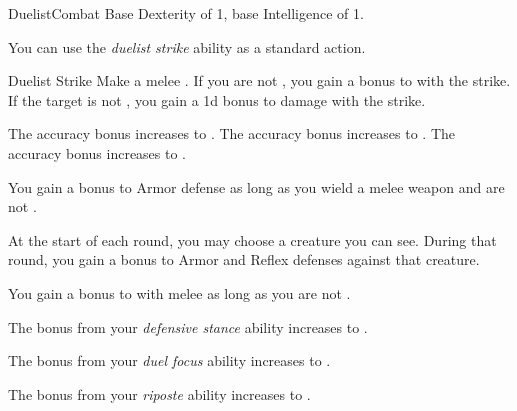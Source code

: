     \begin{feat}{Duelist}{Combat}
        \featpre Base Dexterity of 1, base Intelligence of 1.

         You can use the \textit{duelist strike} ability as a standard action.
        \begin{freeability}{Duelist Strike}
            Make a melee .
            If you are not , you gain a  bonus to  with the strike.
            If the target is not , you gain a \plus1d bonus to damage with the strike.

            \rankline
             The accuracy bonus increases to .
             The accuracy bonus increases to .
             The accuracy bonus increases to .
        \end{freeability}

         You gain a  bonus to Armor defense as long as you wield a melee weapon and are not .

         At the start of each round, you may choose a creature you can see.
        During that round, you gain a  bonus to Armor and Reflex defenses against that creature.

         You gain a  bonus to  with melee  as long as you are not .

         The bonus from your \textit{defensive stance} ability increases to .

         The bonus from your \textit{duel focus} ability increases to .

         The bonus from your \textit{riposte} ability increases to .
    \end{feat}

